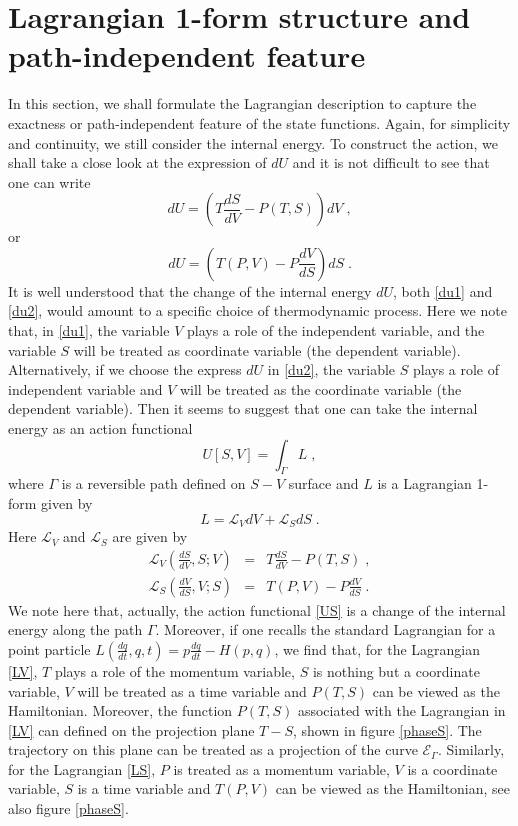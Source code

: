 \documentclass[12pt]{article}
\numberwithin{equation}{section}
\theoremstyle{remark}
\theoremstyle{definition}
\begin{document}
\section{Lagrangian 1-form structure and path-independent feature}\label{LI}
In this section, we shall formulate the Lagrangian description to capture the exactness or path-independent feature of the state functions. Again, for simplicity and continuity, we still consider the internal energy.  To construct the action, we shall take a close look at the expression of $dU$ and it is not difficult to see that one can write
\begin{equation}\label{du1}
    dU=\left(T\frac{dS}{dV}-P(T,S)\right)dV\;,
\end{equation}
or
\begin{equation}\label{du2}
    dU=\left(T(P,V)-P\frac{dV}{dS}\right)dS\;.
\end{equation}
It is well understood that the change of the internal energy $dU$, both \eqref{du1} and \eqref{du2}, would amount to a specific choice of thermodynamic process.
Here we note that, in \eqref{du1}, the variable $V$ plays a role of the independent variable, and the variable $S$ will be treated as coordinate variable (the dependent variable). Alternatively, if we choose the express $dU$ in \eqref{du2}, the variable $S$ plays a role of independent variable and $V$ will be treated as the coordinate variable (the dependent variable).
Then it seems to suggest that one can take the internal energy as an action functional
\begin{equation}
    U[S,V]=\int_\Gamma L\;,\label{US}
\end{equation}
where $\Gamma$ is a reversible path defined on $S-V$ surface and $L$ is a Lagrangian 1-form given by
\begin{equation}
    L=\mathcal{L}_VdV+\mathcal{L}_SdS\;.
\end{equation}
Here $\mathcal{L}_V$ and $\mathcal{L}_S$ are given by
\begin{eqnarray}
    \mathcal{L}_V\left(\frac{dS}{dV},S;V\right)&=&T\frac{dS}{dV}-P(T,S)\;,\label{LV}\\
    \mathcal{L}_S\left(\frac{dV}{dS},V;S\right)&=&T(P,V)-P\frac{dV}{dS}\;\label{LS}.
\end{eqnarray}
We note here that, actually, the action functional \eqref{US} is a change of the internal energy along the path $\Gamma$. Moreover, if one recalls the standard Lagrangian for a point particle $L(\frac{dq}{dt},q,t)=p\frac{dq}{dt}-H(p,q)$, we find that, for the Lagrangian \eqref{LV}, $T$ plays a role of the momentum variable, $S$ is nothing but a coordinate variable, $V$ will be treated as a time variable and $P(T,S)$ can be viewed as the Hamiltonian. Moreover, the function $P(T,S)$ associated with the Lagrangian in \eqref{LV} can defined on the projection plane $T-S$, shown in figure \ref{phaseS}. The trajectory on this plane can be treated as a projection of the curve $\mathscr{E}_\Gamma$. Similarly, for the Lagrangian \eqref{LS}, $P$ is treated as a momentum variable, $V$ is a coordinate variable, $S$ is a time variable and $T(P,V)$ can be viewed as the Hamiltonian, see also figure \ref{phaseS}.
\end{document}
